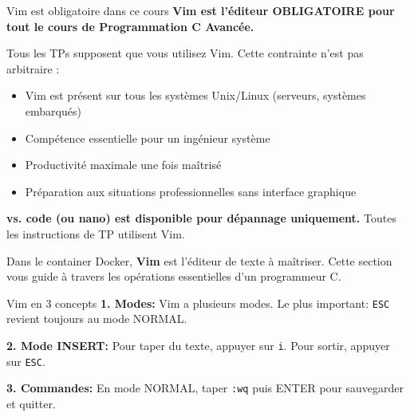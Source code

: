 \documentclass[10pt,a4paper]{article}
\begin{document}
\begin{warningbox}{Vim est obligatoire dans ce cours}
\textbf{Vim est l'éditeur OBLIGATOIRE pour tout le cours de Programmation C Avancée.}

Tous les TPs supposent que vous utilisez Vim. Cette contrainte n'est pas arbitraire :
\begin{itemize}
\item Vim est présent sur tous les systèmes Unix/Linux (serveurs, systèmes embarqués)
\item Compétence essentielle pour un ingénieur système
\item Productivité maximale une fois maîtrisé
\item Préparation aux situations professionnelles sans interface graphique
\end{itemize}

\textbf{vs. code (ou nano) est disponible pour dépannage uniquement.} Toutes les instructions de TP utilisent Vim.
\end{warningbox}

Dans le container Docker, \textbf{Vim} est l'éditeur de texte à maîtriser. Cette section vous guide à travers les opérations essentielles d'un programmeur C.

\begin{infobox}{Vim en 3 concepts}
\textbf{1. Modes:} Vim a plusieurs modes. Le plus important: \texttt{ESC} revient toujours au mode NORMAL.

\textbf{2. Mode INSERT:} Pour taper du texte, appuyer sur \texttt{i}. Pour sortir, appuyer sur \texttt{ESC}.

\textbf{3. Commandes:} En mode NORMAL, taper \texttt{:wq} puis ENTER pour sauvegarder et quitter.
\end{infobox}
\end{document}

